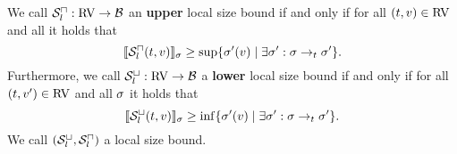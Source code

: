 \begin{definition}
  We call ${\mathcal{S}^\sqcap_l}: \text{RV} \rightarrow \mathcal{B}$ an \textbf{upper} local size bound if and only if for all $(t, v) \in \text{RV}$ and all  it holds that
  \[ \llbracket {\mathcal{S}^\sqcap_l}(t, v) \rrbracket_{\sigma} \geq \sup \lbrace \sigma'(v) \mid \exists \sigma': \sigma \rightarrow_t \sigma' \rbrace. \]
  Furthermore, we call ${\mathcal{S}^\sqcup_l}: \text{RV} \rightarrow \mathcal{B}$ a \textbf{lower} local size bound if and only if for all $(t, v') \in \text{RV}$ and all $\sigma$ it holds that
  \[ \llbracket {\mathcal{S}^\sqcup_l}(t, v) \rrbracket_{\sigma} \geq \inf \lbrace \sigma'(v) \mid \exists \sigma': \sigma \rightarrow_t \sigma' \rbrace. \]
  We call ${({\mathcal{S}^\sqcup_l}, {\mathcal{S}^\sqcap_l})}$ a local size bound.
\end{definition}

